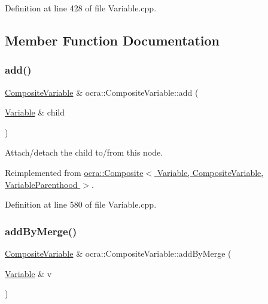 Definition at line 428 of file Variable.\+cpp.



\subsection{Member Function Documentation}
\hypertarget{classocra_1_1CompositeVariable_a3915b8d93a37f7431ce682bdbf725758}{}\label{classocra_1_1CompositeVariable_a3915b8d93a37f7431ce682bdbf725758} 
\subsubsection{\texorpdfstring{add()}{add()}}
{\footnotesize\ttfamily \hyperlink{classocra_1_1CompositeVariable}{Composite\+Variable} \& ocra\+::\+Composite\+Variable\+::add (\begin{DoxyParamCaption}\item[{\hyperlink{classocra_1_1Variable}{Variable} \&}]{child }\end{DoxyParamCaption})\hspace{0.3cm}{\ttfamily [virtual]}}



Attach/detach the child to/from this node. 



Reimplemented from \hyperlink{classocra_1_1Composite_a6751fd4b421edc193c10c858b5f00a34}{ocra\+::\+Composite$<$ Variable, Composite\+Variable, Variable\+Parenthood $>$}.



Definition at line 580 of file Variable.\+cpp.

\hypertarget{classocra_1_1CompositeVariable_a9b09f9bf88fd58fcdad695d762c11d13}{}\label{classocra_1_1CompositeVariable_a9b09f9bf88fd58fcdad695d762c11d13} 
\subsubsection{\texorpdfstring{add\+By\+Merge()}{addByMerge()}}
{\footnotesize\ttfamily \hyperlink{classocra_1_1CompositeVariable}{Composite\+Variable} \& ocra\+::\+Composite\+Variable\+::add\+By\+Merge (\begin{DoxyParamCaption}\item[{\hyperlink{classocra_1_1Variable}{Variable} \&}]{v }\end{DoxyParamCaption})}



